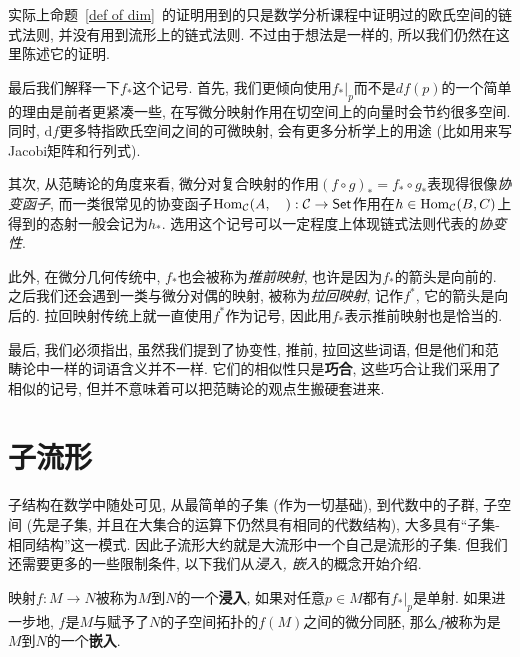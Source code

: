 \begin{rem}
    实际上命题~\ref{def of dim}~的证明用到的只是数学分析课程中证明过的欧氏空间的链式法则, 并没有用到流形上的链式法则.
    不过由于想法是一样的, 所以我们仍然在这里陈述它的证明.
\end{rem}

\begin{rem}
    最后我们解释一下$f_*$这个记号.
    首先, 我们更倾向使用$f_*|_p$而不是$df(p)$的一个简单的理由是前者更紧凑一些, 在写微分映射作用在切空间上的向量时会节约很多空间.
    同时, $\mathrm{d}f$更多特指欧氏空间之间的可微映射, 会有更多分析学上的用途 (比如用来写Jacobi矩阵和行列式).

    其次, 从范畴论的角度来看, 微分对复合映射的作用$(f\circ g)_*=f_*\circ g_*$表现得很像\textit{协变函子}, 而一类很常见的协变函子$\operatorname*{Hom}_{\mathcal{C}}(A,\quad):\mathcal{C}\to\mathsf{Set}$作用在$h\in\operatorname*{Hom}_{\mathcal{C}}(B,C)$上得到的态射一般会记为$h_*$.
    选用这个记号可以一定程度上体现链式法则代表的\textit{协变性}.

    此外, 在微分几何传统中, $f_*$也会被称为\textit{推前映射}, 也许是因为$f_*$的箭头是向前的.
    之后我们还会遇到一类与微分对偶的映射, 被称为\textit{拉回映射}, 记作$f^*$, 它的箭头是向后的.
    拉回映射传统上就一直使用$f^*$作为记号, 因此用$f_*$表示推前映射也是恰当的.  

    最后, 我们必须指出, 虽然我们提到了协变性, 推前, 拉回这些词语, 但是他们和范畴论中一样的词语含义并不一样.
    它们的相似性只是\textbf{巧合}, 这些巧合让我们采用了相似的记号, 但并不意味着可以把范畴论的观点生搬硬套进来.
\end{rem}

\section{子流形}

子结构在数学中随处可见, 从最简单的子集 (作为一切基础), 到代数中的子群, 子空间 (先是子集, 并且在大集合的运算下仍然具有相同的代数结构), 大多具有``子集-相同结构''这一模式.
因此子流形大约就是大流形中一个自己是流形的子集.
但我们还需要更多的一些限制条件, 以下我们从\textit{浸入, 嵌入}的概念开始介绍.

\begin{defn}
    映射$f:M\to N$被称为$M$到$N$的一个\textbf{浸入}, 如果对任意$p\in M$都有$f_*|_p$是单射.
    如果进一步地, $f$是$M$与赋予了$N$的子空间拓扑的$f(M)$之间的微分同胚, 那么$f$被称为是$M$到$N$的一个\textbf{嵌入}.
\end{defn}

